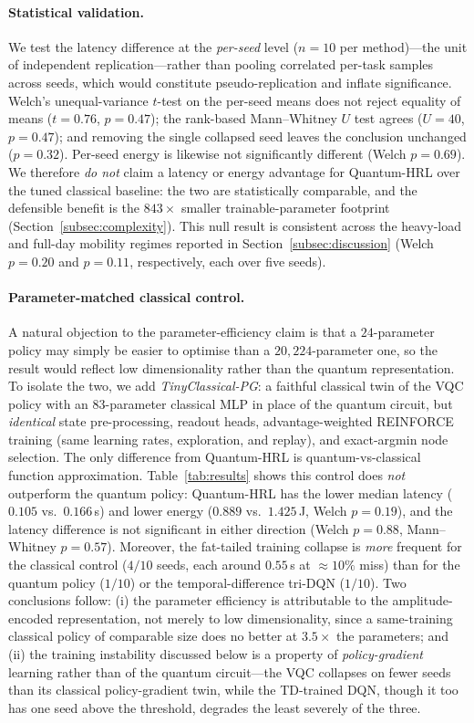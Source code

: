 \documentclass[11pt,a4paper]{article}
\theoremstyle{definition}
\begin{document}
\paragraph{Statistical validation.}
We test the latency difference at the \emph{per-seed} level ($n = 10$ per method)---the unit of independent replication---rather than pooling correlated per-task samples across seeds, which would constitute pseudo-replication and inflate significance. Welch's unequal-variance $t$-test on the per-seed means does not reject equality of means ($t = 0.76$, $p = 0.47$); the rank-based Mann--Whitney $U$ test agrees ($U = 40$, $p = 0.47$); and removing the single collapsed seed leaves the conclusion unchanged ($p = 0.32$). Per-seed energy is likewise not significantly different (Welch $p = 0.69$). We therefore \emph{do not} claim a latency or energy advantage for Quantum-HRL over the tuned classical baseline: the two are statistically comparable, and the defensible benefit is the $843\times$ smaller trainable-parameter footprint (Section~\ref{subsec:complexity}). This null result is consistent across the heavy-load and full-day mobility regimes reported in Section~\ref{subsec:discussion} (Welch $p = 0.20$ and $p = 0.11$, respectively, each over five seeds).

\paragraph{Parameter-matched classical control.}
A natural objection to the parameter-efficiency claim is that a $24$-parameter policy may simply be easier to optimise than a $20{,}224$-parameter one, so the result would reflect low dimensionality rather than the quantum representation. To isolate the two, we add \emph{TinyClassical-PG}: a faithful classical twin of the VQC policy with an $83$-parameter classical MLP in place of the quantum circuit, but \emph{identical} state pre-processing, readout heads, advantage-weighted REINFORCE training (same learning rates, exploration, and replay), and exact-argmin node selection. The only difference from Quantum-HRL is quantum-vs-classical function approximation. Table~\ref{tab:results} shows this control does \emph{not} outperform the quantum policy: Quantum-HRL has the lower median latency ($0.105$ vs.\ $0.166$\,s) and lower energy ($0.889$ vs.\ $1.425$\,J, Welch $p=0.19$), and the latency difference is not significant in either direction (Welch $p=0.88$, Mann--Whitney $p=0.57$). Moreover, the fat-tailed training collapse is \emph{more} frequent for the classical control ($4/10$ seeds, each around $0.55$\,s at $\approx\!10\%$ miss) than for the quantum policy ($1/10$) or the temporal-difference tri-DQN ($1/10$). Two conclusions follow: (i) the parameter efficiency is attributable to the amplitude-encoded representation, not merely to low dimensionality, since a same-training classical policy of comparable size does no better at $3.5\times$ the parameters; and (ii) the training instability discussed below is a property of \emph{policy-gradient} learning rather than of the quantum circuit---the VQC collapses on fewer seeds than its classical policy-gradient twin, while the TD-trained DQN, though it too has one seed above the threshold, degrades the least severely of the three.
\end{document}
